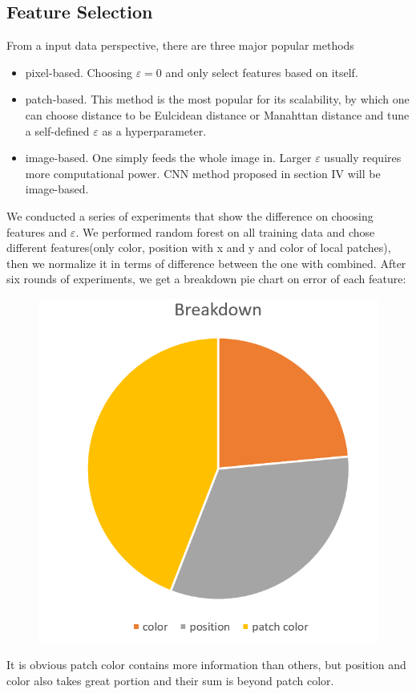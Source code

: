 \documentclass[conference]{IEEEtran}
\begin{document}
\subsection{Feature Selection}
From a input data perspective, there are three major popular methods
\begin{itemize}
\item pixel-based. Choosing $\varepsilon = 0$ and only select features based on itself.
\item patch-based. This method is the most popular for its scalability, by which one can choose distance to be Eulcidean distance or Manahttan distance and tune a self-defined $\varepsilon$ as a hyperparameter. 
\item image-based. One simply feeds the whole image in. Larger $\varepsilon$ usually requires more computational power. CNN method proposed in section IV will be image-based.
\end{itemize}
We conducted a series of experiments that show the difference on choosing features and $\varepsilon$. We performed random forest on all training data and chose different features(only color, position with x and y and color of local patches), then we normalize it in terms of difference between the one with combined. After six rounds of experiments, we get a breakdown pie chart on error of each feature:

\begin{figure}[h!]
\centering 
\includegraphics[scale = 0.4]{Snipaste_2018-05-28_13-52-29.png}
\end{figure}
It is obvious patch color contains more information than others, but position and color also takes great portion and their sum is beyond patch color. 
\end{document}
